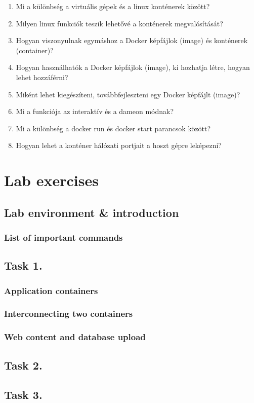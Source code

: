 \documentclass[a4paper]{article}
\begin{document}
\begin{enumerate}
  \item Mi a különbség a virtuális gépek és a linux konténerek között?
  \item Milyen linux funkciók teszik lehetővé a konténerek megvalósítását?
  \item Hogyan viszonyulnak egymáshoz a Docker képfájlok (image) és konténerek (container)?
  \item Hogyan használhatók a Docker képfájlok (image), ki hozhatja létre, hogyan lehet hozzáférni?
  \item Miként lehet kiegészíteni, továbbfejleszteni egy Docker képfájlt (image)?
  \item Mi a funkciója az interaktív és a dameon módnak?
  \item Mi a különbség a docker run és docker start parancsok között?
  \item Hogyan lehet a konténer hálózati portjait a hoszt gépre leképezni? 
\end{enumerate}

\section{Lab exercises}

\subsection{Lab environment \& introduction}
\subsubsection{List of important commands}

\subsection{Task 1.}
\subsubsection{Application containers}
\subsubsection{Interconnecting two containers}
\subsubsection{Web content and database upload}
\subsection{Task 2.}
\subsection{Task 3.}
\end{document}
